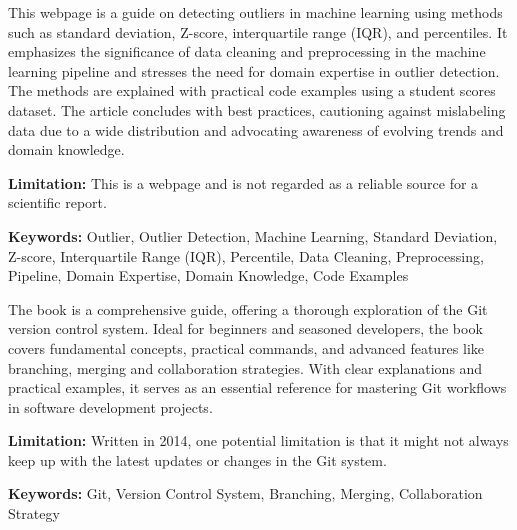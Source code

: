 { 
	This webpage \cite{C:2022} is a guide on detecting outliers in machine learning using methods such as standard deviation, Z-score, interquartile range (IQR), and percentiles. It emphasizes the significance of data cleaning and preprocessing in the machine learning pipeline and stresses the need for domain expertise in outlier detection. The methods are explained with practical code examples using a student scores dataset. The article concludes with best practices, cautioning against mislabeling data due to a wide distribution and advocating awareness of evolving trends and domain knowledge.
	
	\bigskip
	
	\textbf{Limitation:} This is a webpage and is not regarded as a reliable source for a scientific report.
	
	\scriptsize{\textbf{Keywords:} Outlier, Outlier Detection, Machine Learning, Standard Deviation, Z-score, Interquartile Range (IQR), Percentile, Data Cleaning, Preprocessing, Pipeline, Domain Expertise, Domain Knowledge, Code Examples}
}


{ 
	The book \cite{Chacon:2014} is a comprehensive guide, offering a thorough exploration of the Git version control system. Ideal for beginners and seasoned developers, the book covers fundamental concepts, practical commands, and advanced features like branching, merging and collaboration strategies. With clear explanations and practical examples, it serves as an essential reference for mastering Git workflows in software development projects.
	
	\bigskip
	
	\textbf{Limitation:} Written in 2014, one potential limitation is that it might not always keep up with the latest updates or changes in the Git system. 
	
	\scriptsize{\textbf{Keywords:} Git, Version Control System, Branching, Merging, Collaboration Strategy}
}


